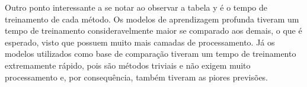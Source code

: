 Outro  ponto  interessante  a  se  notar ao observar a tabela y  é  o  tempo  de  treinamento de cada método. Os modelos de aprendizagem profunda tiveram um tempo de treinamento consideravelmente maior se comparado aos demais, o que é esperado, visto que possuem muito mais camadas de processamento. Já os  modelos  utilizados  como  base  de  comparação  tiveram um  tempo  de treinamento  extremamente  rápido,  pois  são métodos triviais  e  não  exigem  muito  processamento  e,  por consequência, também tiveram as piores previsões.
